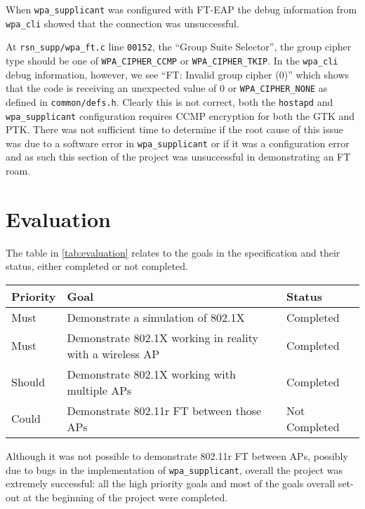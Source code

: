 \documentclass[pdftex, 12pt, a4paper]{article}
\begin{document}
When \verb`wpa_supplicant` was configured with FT-EAP the debug information from \verb`wpa_cli` showed that the connection was unsuccessful.

At \verb`rsn_supp/wpa_ft.c` line \verb`00152`, the ``Group Suite Selector'', the group cipher type should be one of \verb`WPA_CIPHER_CCMP` or \verb`WPA_CIPHER_TKIP`.  In the \verb`wpa_cli` debug information, however, we see ``FT: Invalid group cipher (0)'' which shows that the code is receiving an unexpected value of 0 or \verb`WPA_CIPHER_NONE` as defined in \verb`common/defs.h`.  Clearly this is not correct, both the \verb`hostapd` and \verb`wpa_supplicant` configuration requires CCMP encryption for both the GTK and PTK. There was not sufficient time to determine if the root cause of this issue was due to a software error in \verb`wpa_supplicant` or if it was a configuration error and as such this section of the project was unsuccessful in demonstrating an FT roam.

\section{Evaluation}
The table in \autoref{tab:evaluation} relates to the goals in the specification and their status, either completed or not completed.

\begin{table}[!hb]
    \label{tab:evaluation}
    \begin{tabular}{|l|l|l|}
        \hline
        Priority & Goal                                                     & Status        \\ \hline
        Must     & Demonstrate a simulation of 802.1X                       & Completed     \\ 
        Must     & Demonstrate 802.1X working in reality with a wireless AP & Completed     \\ 
        Should   & Demonstrate 802.1X working with multiple APs             & Completed     \\ 
        Could    & Demonstrate 802.11r FT between those APs                 & Not Completed \\
        \hline
    \end{tabular}
\end{table}

Although it was not possible to demonstrate 802.11r FT between APs, possibly due to bugs in the implementation of \verb`wpa_supplicant`, overall the project was extremely successful: all the high priority goals and most of the goals overall set-out at the beginning of the project were completed.
\end{document}
